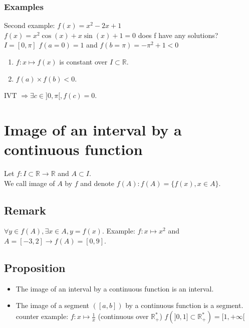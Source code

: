 \documentclass[notitlepage]{math}
\begin{document}
\subsubsection{Examples}
\begin{minipage}{0.4\textwidth}  
\end{minipage}
\begin{minipage}{0.6\textwidth}
    Second example: $f(x) = x^2-2x+1$\\
    $f(x) = x^2 \cos(x)+x\sin(x)+1=0$ does f have any solutions?\\
    $I = [0,\pi]$ $f(a=0)=1$ and $f(b=\pi)=-\pi^2+1<0$
    \begin{enumerate}
        \item $f: x \mapsto f(x)$ is constant over $I \subset \mathbb{R}$.
        \item $f(a) \times f(b) < 0$. 
    \end{enumerate}    
    IVT $\Rightarrow \exists c \in ]0,\pi[, f(c) = 0$.
\end{minipage}
\section{Image of an interval by a continuous function}
Let $f : I \subset \mathbb{R} \to \mathbb{R}$ and $A \subset I$.\\
We call image of $A$ by $f$ and denote $f(A) : f(A) = \{f(x), x \in A\}$.
\subsection{Remark}
$\forall y \in f(A), \exists x \in A, y = f(x)$.
Example: $f: x \mapsto x^2$ and $A = [-3,2] \rightarrow f(A) = [0,9]$.
\subsection{Proposition}
\begin{itemize}
    \item The image of an interval by a continuous function is an interval.
    \item The image of a segment $([a,b])$ by a continuous function is a segment.
    counter example: $f: x \mapsto \frac{1}{x}$ (continuous over $\mathbb{R}^*_+$) \quad
    $f(]0,1] \subset \mathbb{R}^*_+) = [1,+\infty[$
\end{itemize}
\end{document}
